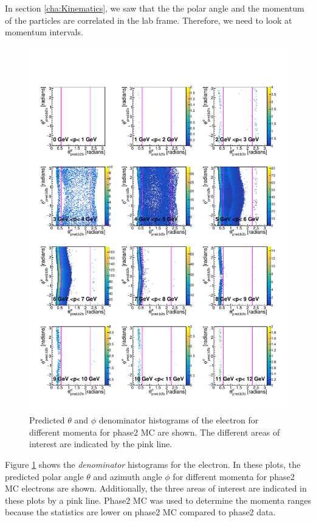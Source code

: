 \documentclass[a4paper,11pt,twosided,final,german,openbib,pdftex,listof=totoc,bibliography=totoc]{scrbook}
\begin{document}
In section \ref{cha:Kinematics}, we saw that the the polar angle and the momentum of the particles are correlated in the lab frame. Therefore, we need to look at momentum intervals. 

\begin{figure}[h!]
	\includegraphics[width=\textwidth]{Plots/master/RTPMemD_MC.pdf}
	\caption[Denominator $\theta$-$\phi$ Electron Momentum MC]{Predicted $\theta$ and $\phi$ denominator histograms of the electron for different momenta for phase2 MC are shown. The different areas of interest are indicated by the pink line.}
	\label{plt:RTPMemD_MC}
\end{figure}

Figure \ref{plt:RTPMemD_MC} shows the \textit{denominator} histograms for the electron. In these plots, the predicted polar angle $\theta$ and azimuth angle $\phi$ for different momenta for phase2 MC electrons are shown. Additionally, the three areas of interest are indicated in these plots by a pink line. Phase2 MC was used to determine the momenta ranges because the statistics are lower on phase2 MC compared to phase2 data. 
\end{document}
